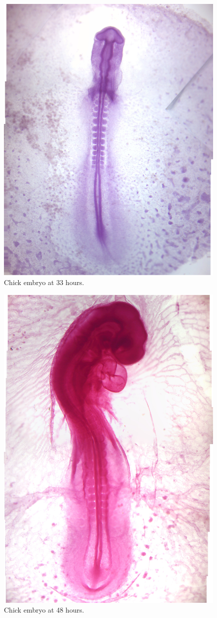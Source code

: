 \begin{figure}

{\centering \includegraphics[width=0.7\linewidth]{./figures/development/chick_33h}

}

\caption{Chick embryo at 33 hours.}\label{fig:chick33h}
\end{figure}

\begin{figure}

{\centering \includegraphics[width=0.7\linewidth]{./figures/development/chick_48h}

}

\caption{Chick embryo at 48 hours.}\label{fig:chick48h}
\end{figure}

